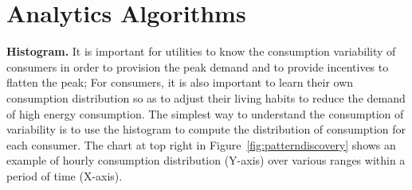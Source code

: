 \documentclass{sig-alternate}
\begin{document}
\section{Analytics Algorithms}
{\bf Histogram.} It is important for utilities to know the consumption variability of consumers in order to provision the peak demand and to provide incentives to flatten the peak; For consumers, it is also important to learn their own consumption distribution so as to adjust their living habits to reduce the demand of high energy consumption. The simplest way to understand the consumption of variability  is to use the histogram to compute the distribution of consumption for each consumer. The chart at top right in Figure~\ref{fig:patterndiscovery} shows an example of hourly consumption distribution (Y-axis) over various ranges within a period of time (X-axis). 
\end{document}

